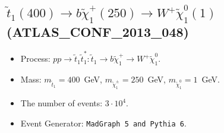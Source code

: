 \documentclass[12pt]{article}
\begin{document}
    
\subsection*{$\tilde t_1(400) \to b \tilde \chi_1^+(250) \to W^+ \tilde \chi_1^0(1)$ (ATLAS\_CONF\_2013\_048)} 


        \begin{itemize}
        \item  Process: $pp \to \tilde t_1 \tilde t_1^*: \tilde t_1 \to b \tilde \chi_1^+ \to W^+ \tilde \chi_1^0$.
        \item  Mass: $m_{\tilde t_1} = 400$~GeV, $m_{\tilde \chi_1^\pm} = 250$~GeV, $m_{\tilde \chi_1^0} = 1$~GeV.
        \item  The number of events: $3 \cdot 10^4$.
        \item  Event Generator: {\tt MadGraph 5 and Pythia 6}.    
        \end{itemize}    
    
\end{document}
